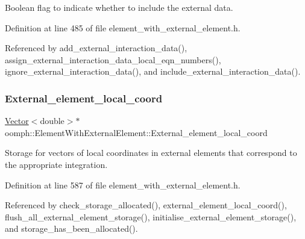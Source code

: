 Boolean flag to indicate whether to include the external data. 



Definition at line 485 of file element\+\_\+with\+\_\+external\+\_\+element.\+h.



Referenced by add\+\_\+external\+\_\+interaction\+\_\+data(), assign\+\_\+external\+\_\+interaction\+\_\+data\+\_\+local\+\_\+eqn\+\_\+numbers(), ignore\+\_\+external\+\_\+interaction\+\_\+data(), and include\+\_\+external\+\_\+interaction\+\_\+data().

\mbox{\label{classoomph_1_1ElementWithExternalElement_a7de6fe7b0230003be863e156e516d803}} 
\subsubsection{\texorpdfstring{External\+\_\+element\+\_\+local\+\_\+coord}{External\_element\_local\_coord}}
{\footnotesize\ttfamily \hyperlink{classoomph_1_1Vector}{Vector}$<$double$>$$\ast$ oomph\+::\+Element\+With\+External\+Element\+::\+External\+\_\+element\+\_\+local\+\_\+coord\hspace{0.3cm}{\ttfamily [private]}}



Storage for vectors of local coordinates in external elements that correspond to the appropriate integration. 



Definition at line 587 of file element\+\_\+with\+\_\+external\+\_\+element.\+h.



Referenced by check\+\_\+storage\+\_\+allocated(), external\+\_\+element\+\_\+local\+\_\+coord(), flush\+\_\+all\+\_\+external\+\_\+element\+\_\+storage(), initialise\+\_\+external\+\_\+element\+\_\+storage(), and storage\+\_\+has\+\_\+been\+\_\+allocated().

\mbox{\label{classoomph_1_1ElementWithExternalElement_a716c9187aad0ca94fc39391fed292f96}} 

